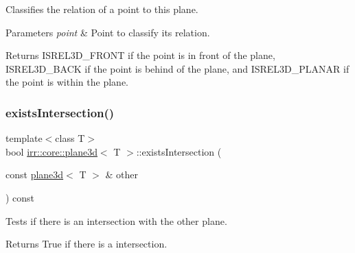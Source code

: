 Classifies the relation of a point to this plane. 


\begin{DoxyParams}{Parameters}
{\em point} & Point to classify its relation. \\
\hline
\end{DoxyParams}
\begin{DoxyReturn}{Returns}
I\+S\+R\+E\+L3\+D\+\_\+\+F\+R\+O\+NT if the point is in front of the plane, I\+S\+R\+E\+L3\+D\+\_\+\+B\+A\+CK if the point is behind of the plane, and I\+S\+R\+E\+L3\+D\+\_\+\+P\+L\+A\+N\+AR if the point is within the plane. 
\end{DoxyReturn}
\mbox{\label{classirr_1_1core_1_1plane3d_a62f0838578d34260a5ef664718be59b4}} 
\subsubsection{\texorpdfstring{exists\+Intersection()}{existsIntersection()}\hspace{0.1cm}{\footnotesize\ttfamily [1/2]}}
{\footnotesize\ttfamily template$<$class T$>$ \\
bool \hyperlink{classirr_1_1core_1_1plane3d}{irr\+::core\+::plane3d}$<$ T $>$\+::exists\+Intersection (\begin{DoxyParamCaption}\item[{const \hyperlink{classirr_1_1core_1_1plane3d}{plane3d}$<$ T $>$ \&}]{other }\end{DoxyParamCaption}) const\hspace{0.3cm}{\ttfamily [inline]}}



Tests if there is an intersection with the other plane. 

\begin{DoxyReturn}{Returns}
True if there is a intersection. 
\end{DoxyReturn}
\mbox{\label{classirr_1_1core_1_1plane3d_a62f0838578d34260a5ef664718be59b4}} 
